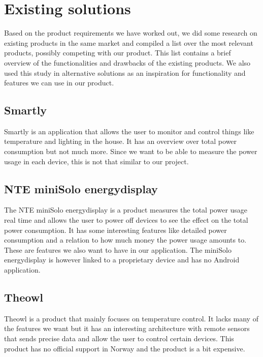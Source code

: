 \section{Existing solutions}

Based on the product requirements we have worked out, we did some research on existing products in the same market and compiled a list over the most relevant products, possibly competing with our product. This list contains a brief overview of the functionalities and drawbacks of the existing products. We also used this study in alternative solutions as an inspiration for functionality and features we can use in our product.

\subsection{Smartly}

Smartly\cite{smartly} is an application that allows the user to monitor and control things like temperature and lighting in the house. It has an overview over total power consumption but not much more. Since we want to be able to measure the power usage in each device, this is not that similar to our project. 


\subsection{NTE miniSolo energydisplay}

The NTE miniSolo energydisplay\cite{nte} is a product measures the total power usage real time and allows the user to power off devices to see the effect on the total power consumption. It has some interesting features like detailed power consumption and a relation to how much money the power usage amounts to. These are features we also want to have in our application. The miniSolo energydisplay is however linked to a proprietary device and has no Android application.



\subsection{Theowl}

Theowl\cite{theowl} is a product that mainly focuses on temperature control. It lacks many of the features we want but it has an interesting architecture with remote sensors that sends precise data and allow the user to control certain devices. This product has no official support in Norway and the product is a bit expensive.


